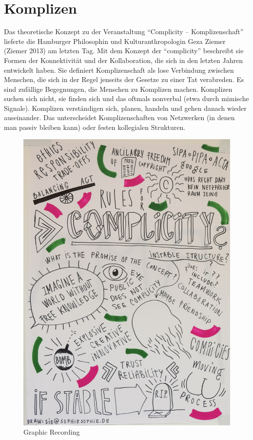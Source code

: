 \documentclass[a4paper,
fontsize=11pt,
oneside,
numbers=noperiodatend,
parskip=half-,
bibliography=totoc,
final
]{scrartcl}
\begin{document}
\section*{Komplizen}\label{komplizen}

Das theoretische Konzept zu der Veranstaltung \enquote{Complicity --
Komplizenschaft} lieferte die Hamburger Philosophin und
Kulturanthropologin Geza Ziemer (Ziemer 2013) am letzten Tag. Mit dem
Konzept der \enquote{complicity} beschreibt sie Formen der Konnektivität
und der Kollaboration, die sich in den letzten Jahren entwickelt haben.
Sie definiert Komplizenschaft als lose Verbindung zwischen Menschen, die
sich in der Regel jenseits der Gesetze zu einer Tat verabreden. Es sind
zufällige Begegnungen, die Menschen zu Komplizen machen. Komplizen
suchen sich nicht, sie finden sich und das oftmals nonverbal (etwa durch
mimische Signale). Komplizen verständigen sich, planen, handeln und
gehen danach wieder auseinander. Das unterscheidet Komplizenschaften von
Netzwerken (in denen man passiv bleiben kann) oder festen kollegialen
Strukturen.

\begin{figure}[htbp]
\centering
\includegraphics{./img/GraphicRecording_02.jpg}
\caption{Graphic Recording}
\end{figure}
\end{document}
